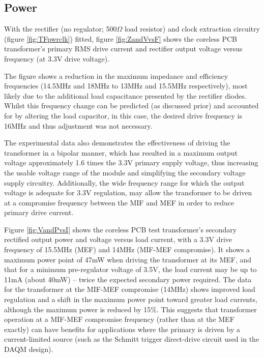 \documentclass[conference]{IEEEtran}
\begin{document}
	\subsection{Power}
	With the rectifier (no regulator; 500$\Omega$ load resistor) and clock extraction circuitry (figure \ref{fig:TFpwrclk}) fitted, figure \ref{fig:ZandVvsF} shows the coreless PCB transformer's primary RMS drive current and rectifier output voltage versus frequency (at 3.3V drive voltage).
	
	The figure shows a reduction in the maximum impedance and efficiency frequencies (14.5MHz and 18MHz to 13MHz and 15.5MHz respectively), most likely due to the additional load capacitance presented by the rectifier diodes.  Whilst this frequency change can be predicted (as discussed prior) and accounted for by altering the load capacitor, in this case, the desired drive frequency is 16MHz and thus adjustment was not necessary.
	
	The experimental data also demonstrates the effectiveness of driving the transformer in a bipolar manner, which has resulted in a maximum output voltage approximately 1.6 times the 3.3V primary supply voltage, thus increasing the usable voltage range of the module and simplifying the secondary voltage supply circuitry.  Additionally, the wide frequency range for which the output voltage is adequate for 3.3V regulation, may allow the transformer to be driven at a compromise frequency between the MIF and MEF in order to reduce primary drive current.
	
	Figure \ref{fig:VandPvsI} shows the coreless PCB test transformer's secondary rectified output power and voltage versus load current, with a 3.3V drive frequency of 15.5MHz (MEF) and 14MHz (MIF-MEF compromise).  It shows a maximum power point of 47mW when driving the transformer at its MEF, and that for a minimum pre-regulator voltage of 3.5V, the load current may be up to 11mA (about 40mW) -- twice the expected secondary power required.  The data for the transformer at the MIF-MEF compromise (14MHz) shows improved load regulation and a shift in the maximum power point toward greater load currents, although the maximum power is reduced by 15\%.  This suggests that transformer operation at a MIF-MEF compromise frequency (rather than at the MEF exactly) can have benefits for applications where the primary is driven by a current-limited source (such as the Schmitt trigger direct-drive circuit used in the DAQM design).
\end{document}
